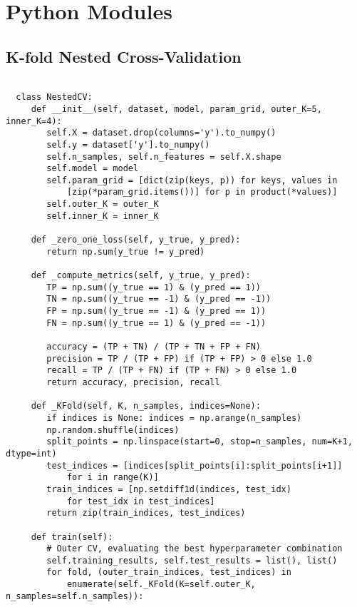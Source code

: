 
\chapter{Python Modules}

\section{K-fold Nested Cross-Validation}\label{appendix:nestedcv}

\begin{verbatim}

  class NestedCV:
     def __init__(self, dataset, model, param_grid, outer_K=5, inner_K=4):
        self.X = dataset.drop(columns='y').to_numpy()
        self.y = dataset['y'].to_numpy()
        self.n_samples, self.n_features = self.X.shape
        self.model = model
        self.param_grid = [dict(zip(keys, p)) for keys, values in 
            [zip(*param_grid.items())] for p in product(*values)]
        self.outer_K = outer_K
        self.inner_K = inner_K

     def _zero_one_loss(self, y_true, y_pred):
        return np.sum(y_true != y_pred)

     def _compute_metrics(self, y_true, y_pred):
        TP = np.sum((y_true == 1) & (y_pred == 1))
        TN = np.sum((y_true == -1) & (y_pred == -1))
        FP = np.sum((y_true == -1) & (y_pred == 1))
        FN = np.sum((y_true == 1) & (y_pred == -1))

        accuracy = (TP + TN) / (TP + TN + FP + FN)
        precision = TP / (TP + FP) if (TP + FP) > 0 else 1.0
        recall = TP / (TP + FN) if (TP + FN) > 0 else 1.0
        return accuracy, precision, recall

     def _KFold(self, K, n_samples, indices=None):
        if indices is None: indices = np.arange(n_samples)
        np.random.shuffle(indices)
        split_points = np.linspace(start=0, stop=n_samples, num=K+1, dtype=int)
        test_indices = [indices[split_points[i]:split_points[i+1]]
            for i in range(K)]
        train_indices = [np.setdiff1d(indices, test_idx)
            for test_idx in test_indices]
        return zip(train_indices, test_indices)

     def train(self):
        # Outer CV, evaluating the best hyperparameter combination 
        self.training_results, self.test_results = list(), list()
        for fold, (outer_train_indices, test_indices) in
            enumerate(self._KFold(K=self.outer_K, n_samples=self.n_samples)):


\end{verbatim}
